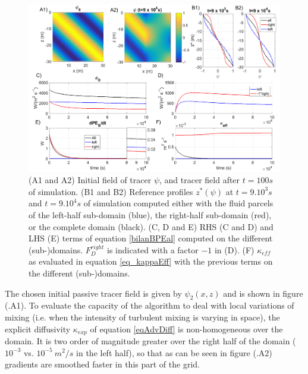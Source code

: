 \begin{figure}[h!]
\centering
\includegraphics[width=1\textwidth]{./CHAP_BPE/AGBPE_numlab2_2.png}
\caption[Initial field and evaluation of $\kappa_{eff}$ for configuration $BPE_{exp}$]{(A1 and A2) Initial field of tracer $\psi$, and tracer field after $t=100s$ of simulation. (B1 and B2) Reference profiles $z^*(\psi)$ at $t=9.10^3s$ and $t=9.10^4s$ of simulation computed either with the fluid parcels of the left-half sub-domain (blue), the right-half sub-domain (red), or the complete domain (black). (C, D and E) RHS (C and D) and LHS (E) terms of equation \ref{bilanBPEal} computed on the different (sub-)domains. $F_D^{right}$ is indicated with a factor $-1$ in (D). (F) $\kappa_{eff}$ as evaluated in equation \ref{eq_kappaEff} with the previous terms on the different (sub-)domains.}
\label{fig2numlab}
\end{figure}

The chosen initial passive tracer field is given by $\psi_2 (x,z)$ and is shown in figure (.A1).
To evaluate the capacity of the algorithm to deal with local variations of mixing (i.e. when the intensity of turbulent mixing is varying in space), the explicit diffusivity $\kappa_{exp}$ of equation \ref{eqAdvDiff} is non-homogeneous over the domain. It is two order of magnitude greater over the right half of the domain ($10^{-3}$ vs. $10^{-5} \ m^2/s$ in the left half), so that as can be seen in figure (.A2) gradients are smoothed faster in this part of the grid.

